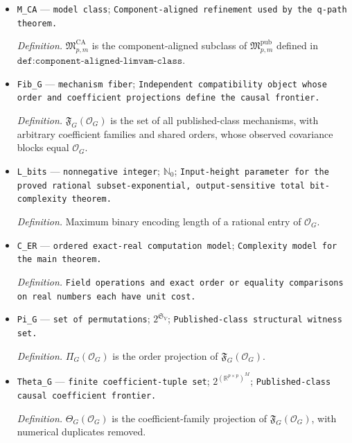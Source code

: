 \documentclass{article}
\begin{document}
\begin{itemize}
  \item \texttt{M\_\allowbreak{}CA} --- \texttt{model class}; \texttt{Component-\allowbreak{}aligned refinement used by the q-\allowbreak{}path theorem.}
  \par\smallskip\noindent\emph{Definition.} \(\mathfrak M_{p,m}^{\mathrm{CA}}\) is the component-aligned subclass of \(\mathfrak M_{p,m}^{\mathrm{pub}}\) defined in \(\texttt{def:component-aligned-limvam-class}\).
  \item \texttt{Fib\_\allowbreak{}G} --- \texttt{mechanism fiber}; \texttt{Independent compatibility object whose order and coefficient projections define the causal frontier.}
  \par\smallskip\noindent\emph{Definition.} \(\mathfrak F_G(\mathcal O_G)\) is the set of all published-class mechanisms, with arbitrary coefficient families and shared orders, whose observed covariance blocks equal \(\mathcal O_G\).
  \item \texttt{L\_\allowbreak{}bits} --- \texttt{nonnegative integer}; \(\mathbb N_0\); \texttt{Input-\allowbreak{}height parameter for the proved rational subset-\allowbreak{}exponential,\allowbreak{} output-\allowbreak{}sensitive total bit-\allowbreak{}complexity theorem.}
  \par\smallskip\noindent\emph{Definition.} Maximum binary encoding length of a rational entry of \(\mathcal O_G\).
  \item \texttt{C\_\allowbreak{}ER} --- \texttt{ordered exact-\allowbreak{}real computation model}; \texttt{Complexity model for the main theorem.}
  \par\smallskip\noindent\emph{Definition.} \texttt{Field operations and exact order or equality comparisons on real numbers each have unit cost.}
  \item \texttt{Pi\_\allowbreak{}G} --- \texttt{set of permutations}; \(2^{\mathfrak S_V}\); \texttt{Published-\allowbreak{}class structural witness set.}
  \par\smallskip\noindent\emph{Definition.} \(\Pi_G(\mathcal O_G)\) is the order projection of \(\mathfrak F_G(\mathcal O_G)\).
  \item \texttt{Theta\_\allowbreak{}G} --- \texttt{finite coefficient-\allowbreak{}tuple set}; \(2^{(\mathbb R^{p\times p})^M}\); \texttt{Published-\allowbreak{}class causal coefficient frontier.}
  \par\smallskip\noindent\emph{Definition.} \(\Theta_G(\mathcal O_G)\) is the coefficient-family projection of \(\mathfrak F_G(\mathcal O_G)\), with numerical duplicates removed.

\end{itemize}
\end{document}
